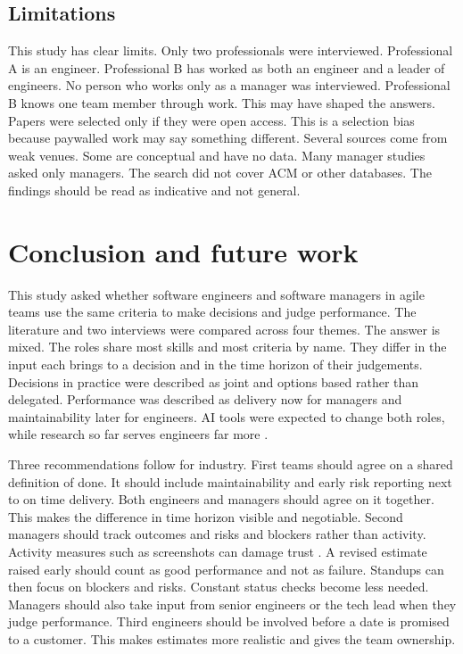 \documentclass[conference]{IEEEtran}
\begin{document}
\subsection{Limitations}

This study has clear limits. Only two professionals were interviewed. Professional A is an engineer. Professional B has worked as both an engineer and a leader of engineers. No person who works only as a manager was interviewed. Professional B knows one team member through work. This may have shaped the answers. Papers were selected only if they were open access. This is a selection bias because paywalled work may say something different. Several sources come from weak venues. Some are conceptual and have no data. Many manager studies asked only managers. The search did not cover ACM or other databases. The findings should be read as indicative and not general.

\section{Conclusion and future work}

This study asked whether software engineers and software managers in agile teams use the same criteria to make decisions and judge performance. The literature and two interviews were compared across four themes. The answer is mixed. The roles share most skills and most criteria by name. They differ in the input each brings to a decision and in the time horizon of their judgements. Decisions in practice were described as joint and options based rather than delegated. Performance was described as delivery now for managers and maintainability later for engineers. AI tools were expected to change both roles, while research so far serves engineers far more \cite{zhang2026}.

Three recommendations follow for industry. First teams should agree on a shared definition of done. It should include maintainability and early risk reporting next to on time delivery. Both engineers and managers should agree on it together. This makes the difference in time horizon visible and negotiable. Second managers should track outcomes and risks and blockers rather than activity. Activity measures such as screenshots can damage trust \cite{kurt2024,suwarno2025}. A revised estimate raised early should count as good performance and not as failure. Standups can then focus on blockers and risks. Constant status checks become less needed. Managers should also take input from senior engineers or the tech lead when they judge performance. Third engineers should be involved before a date is promised to a customer. This makes estimates more realistic and gives the team ownership.
\end{document}
